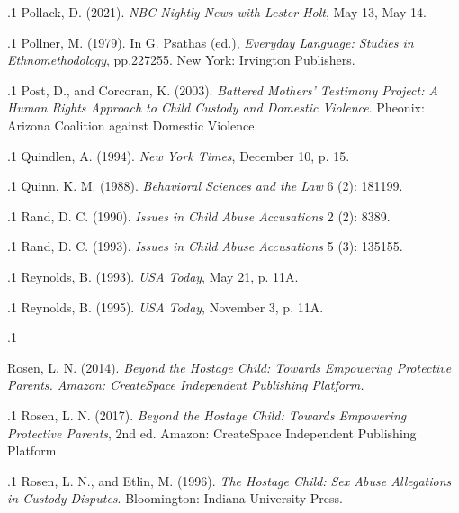\documentclass[11pt, twoside]{article}
\begin{document}
{\p.1{%
Pollack, D. (2021).  \textit{NBC Nightly News with Lester Holt}, May 13, May
14.
}%

\p.1{%
Pollner, M. (1979).  In G. Psathas (ed.), \textit{Everyday Language: Studies in
Ethnomethodology}, pp.\@ 227\ndash{}255. New York: Irvington Publishers.
}%

\p.1{%
Post, D., and Corcoran, K. (2003). \textit{Battered Mothers’ Testimony Project: A Human Rights Approach to Child Custody and Domestic Violence}. Pheonix: Arizona
Coalition against Domestic Violence.
}%

\p.1{%
Quindlen, A. (1994).  \textit{New
York Times}, December 10, p. 15.
}%

\p.1{%
Quinn, K. M. (1988). 
\textit{Behavioral Sciences and the Law} 6 (2): 181\ndash{}199.
}%

\p.1{%
Rand, D. C. (1990).  \textit{Issues in Child Abuse Accusations} 2 (2): 83\ndash{}89.
}%

\p.1{%
Rand, D. C. (1993). 
\textit{Issues in Child Abuse Accusations} 5 (3): 135\ndash{}155.
}%

\p.1{%
Reynolds, B. (1993). 
\textit{USA Today}, May 21, p. 11A.
}%

\p.1{%
Reynolds, B. (1995).  \textit{USA Today}, November 3,
p. 11A.
}%

\p.1{%
Rosen, L. N. (2014). \textit{Beyond the Hostage Child: Towards Empowering Protective
Parents. Amazon: CreateSpace Independent Publishing Platform.
}%

\p.1{%
Rosen, L. N. (2017). \textit{Beyond the Hostage Child: Towards Empowering
Protective Parents}, 2nd ed. Amazon: CreateSpace Independent Publishing Platform
}%

\p.1{%
Rosen, L. N., and Etlin, M. (1996). \textit{The Hostage Child: Sex Abuse Allegations in Custody
Disputes}. Bloomington: Indiana University Press.
}%

}}
\end{document}
